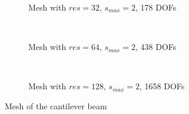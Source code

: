     \begin{figure}[h!]
        \begin{subfigure}[b]{1\linewidth}
            \centering
            \caption{Mesh with $res=32$, $s_{max}=2$, 178 DOFs}
        \end{subfigure}
        \\
        \begin{subfigure}[b]{1\linewidth}
            \centering
            \caption{Mesh with $res=64$, $s_{max}=2$, 438 DOFs}
        \end{subfigure}
        \\
        \begin{subfigure}[b]{1\linewidth}
            \centering
            \caption{Mesh with $res=128$, $s_{max}=2$, 1658 DOFs}
        \end{subfigure}
        \caption[Mesh of the cantilever beam]{Mesh of the cantilever beam}
        \label{qdt_fig:ex_cantilever_mesh_all}
    \end{figure}
